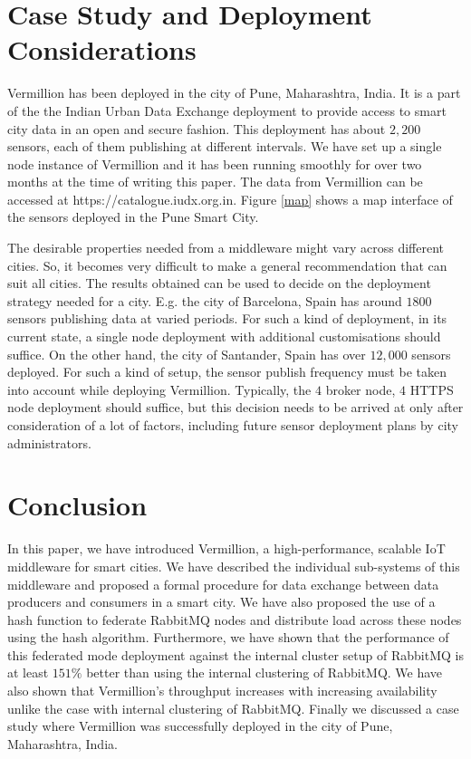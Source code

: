 \documentclass[conference, 10pt]{IEEEtran}
\begin{document}
\section{Case Study and Deployment Considerations}
Vermillion has been deployed in the city of Pune, Maharashtra, India. It is a part of the  the Indian Urban Data Exchange \cite{iudx} deployment to provide access to smart city data in an open and secure fashion. This deployment has about $2,200$ sensors, each of them publishing at different intervals. We have set up a single node instance of Vermillion and it has been running smoothly for over two months at the time of writing this paper. The data from Vermillion can be accessed at https://catalogue.iudx.org.in. Figure \ref{map} shows a map interface of the sensors deployed in the Pune Smart City.

The desirable properties needed from a middleware might vary across different cities. So, it becomes very difficult to make a general recommendation that can suit all cities. The results obtained can be used to decide on the deployment strategy needed for a city. E.g. the city of Barcelona, Spain has around $1800$ sensors publishing data at varied periods\cite{barcelona}. For such a kind of deployment, in its current state, a single node deployment with additional customisations should suffice. On the other hand, the city of Santander, Spain has over $12,000$ sensors deployed\cite{esri}. For such a kind of setup, the sensor publish frequency must be taken into account while deploying Vermillion. Typically, the $4$ broker node, $4$ HTTPS node deployment should suffice, but this decision needs to be arrived at only after consideration of a lot of factors, including future sensor deployment plans by city administrators. 

\section{Conclusion}
In this paper, we have introduced Vermillion, a high-performance, scalable IoT middleware for smart cities. We have described the individual sub-systems of this middleware and proposed a formal procedure for data exchange between data producers and consumers in a smart city. We have also proposed the use of a hash function to federate RabbitMQ nodes and distribute load across these nodes using the hash algorithm. Furthermore, we have shown that the performance of this federated mode deployment against the internal cluster setup of RabbitMQ is at least $151\%$ better than using the internal clustering of RabbitMQ. We have also shown that Vermillion's throughput increases with increasing availability unlike the case with internal clustering of RabbitMQ. Finally we discussed a case study where Vermillion was successfully deployed in the city of Pune, Maharashtra, India.
\end{document}
